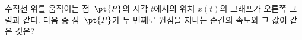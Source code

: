 \noindent\begin{minipage}[t]{0.58\linewidth}\vspace{0pt}\raggedright 수직선 위를 움직이는 점~$\pt{P}$의 시각 $t$에서의 위치 $x(t)$의 그래프가 오른쪽 그림과 같다. 다음 중 점~$\pt{P}$가 두 번째로 원점을 지나는 순간의 속도와 그 값이 같은 것은?\end{minipage}\hfill\begin{minipage}[t]{0.4\linewidth}\vspace{0pt}\centering \resizebox{\ifdim\width>\linewidth\linewidth\else\width\fi}{!}{}\end{minipage}\par
{}
